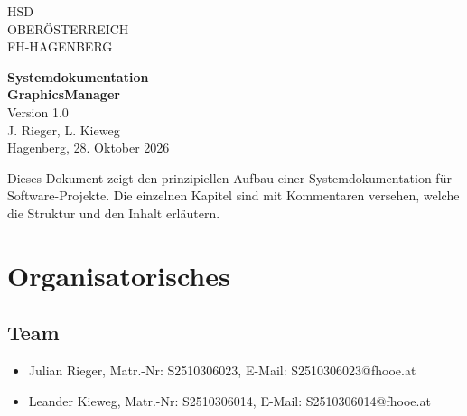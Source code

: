 \documentclass[a4paper,12pt]{article}
\begin{document}





\begin{titlepage}
\vspace*{-1cm}
\noindent
HSD\\
OBERÖSTERREICH\\
FH-HAGENBERG

\vspace{4cm}
\begin{center}
{\Huge \textbf{Systemdokumentation}}\\[1cm]
{\Large \textbf{GraphicsManager}}\\[0.5cm]
{\large Version 1.0}\\[2cm]
{\large J. Rieger, L. Kieweg}\\[0.5cm]
{\large Hagenberg, 28. Oktober 2026}
\end{center}

\vspace{3cm}
\noindent
Dieses Dokument zeigt den prinzipiellen Aufbau einer Systemdokumentation für Software-Projekte. Die einzelnen Kapitel sind mit Kommentaren versehen, welche die Struktur und den Inhalt erläutern.
\end{titlepage}

\newpage
\tableofcontents
\newpage

\section{Organisatorisches}
\subsection {Team}
\begin{itemize}
\item Julian Rieger, Matr.-Nr: S2510306023, E-Mail: S2510306023@fhooe.at
\item Leander Kieweg, Matr.-Nr: S2510306014, E-Mail: S2510306014@fhooe.at
\end{itemize}
\end{document}
